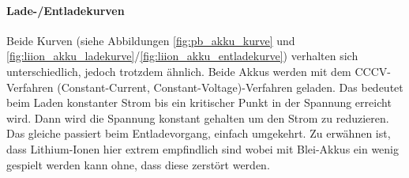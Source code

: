 \paragraph{Lade-/Entladekurven}

Beide Kurven (siehe Abbildungen \ref{fig:pb_akku_kurve} und \ref{fig:liion_akku_ladekurve}/\ref{fig:liion_akku_entladekurve}) verhalten sich unterschiedlich, jedoch trotzdem ähnlich. Beide Akkus werden mit dem CCCV-Verfahren (Constant-Current, Constant-Voltage)-Verfahren geladen. Das bedeutet beim Laden konstanter Strom bis ein kritischer Punkt in der Spannung erreicht wird. Dann wird die Spannung konstant gehalten um den Strom zu reduzieren. Das gleiche passiert beim Entladevorgang, einfach umgekehrt. Zu erwähnen ist, dass Lithium-Ionen hier extrem empfindlich sind wobei mit Blei-Akkus ein wenig gespielt werden kann ohne, dass diese zerstört werden.

\newpage

